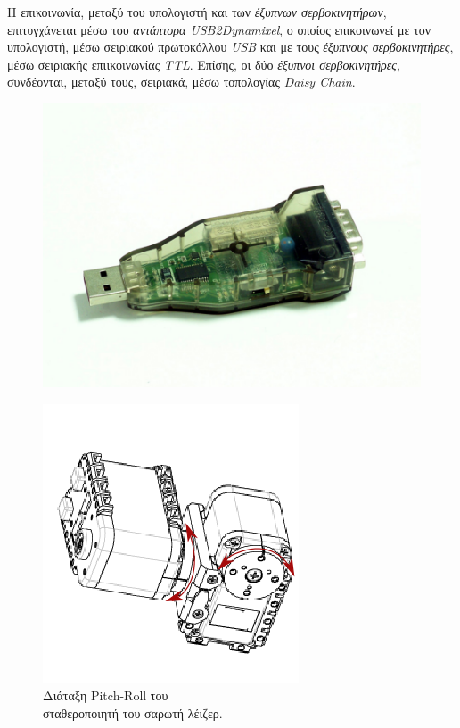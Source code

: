 \bigskip
Η επικοινωνία, μεταξύ του υπολογιστή και των \textit{έξυπνων σερβοκινητήρων}, επιτυγχάνεται μέσω του \textit{αντάπτορα USB2Dynamixel}, ο οποίος επικοινωνεί με τον υπολογιστή, μέσω σειριακού πρωτοκόλλου \textit{USB} και με τους \textit{έξυπνους σερβοκινητήρες}, μέσω σειριακής επιικοινωνίας \textit{TTL}. Επίσης, οι δύο \textit{έξυπνοι σερβοκινητήρες}, συνδέονται, μεταξύ τους, σειριακά, μέσω τοπολογίας \textit{Daisy Chain}.

\begin{figure}[!ht]
	\begin{minipage}[t]{.49\textwidth}
 	\centering
		\includegraphics[width=0.7\linewidth]{Chapters/Chapter2/Figures/usb2dynamixel.png}
		\label{fig:usb2dynamixel}
	\end{minipage}
	\begin{minipage}[t]{.5\textwidth}		
		\centering
		\includegraphics[width=0.6\linewidth]{Chapters/Chapter2/Figures/pitch_roll_dxl.png}
		\caption{Διάταξη Pitch-Roll του\\ σταθεροποιητή του σαρωτή λέιζερ.}
		\label{fig:pitch_roll_dxl}
	\end{minipage}
\end{figure}

